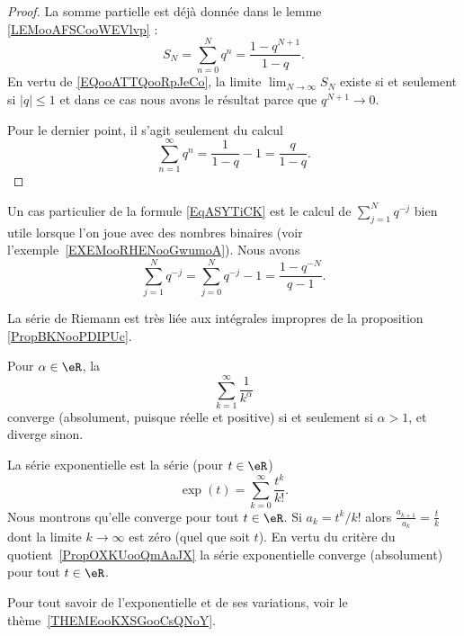 \begin{proof}
    La somme partielle est déjà donnée dans le lemme \ref{LEMooAFSCooWEVlvp} :
    \begin{equation}
        S_N=\sum_{n=0}^Nq^n=\frac{ 1-q^{N+1} }{ 1-q }.
    \end{equation}
    En vertu de \eqref{EQooATTQooRpJeCo}, la limite \( \lim_{N\to \infty} S_N\) existe si et seulement si \( | q |\leq 1\) et dans ce cas nous avons le résultat parce que \( q^{N+1}\to 0\).

    Pour le dernier point, il s'agit seulement du calcul
    \begin{equation}
        \sum_{n=1}^{\infty}q^n=\frac{1}{ 1-q }-1=\frac{ q }{ 1-q }.
    \end{equation}
\end{proof}



Un cas particulier de la formule \eqref{EqASYTiCK} est le calcul de \( \sum_{j=1}^{N}q^{-j}\) bien utile lorsque l'on joue avec des nombres binaires (voir l'exemple~\ref{EXEMooRHENooGwumoA}). Nous avons
\begin{equation}        \label{EQooFMBAooEJkHWT}
    \sum_{j=1}^Nq^{-j}=\sum_{j=0}^Nq^{-j}-1=\frac{ 1-q^{-N} }{ q-1 }.
\end{equation}

La série de Riemann est très liée aux intégrales impropres de la proposition \ref{PropBKNooPDIPUc}.
\begin{proposition} \label{PROPooFPVZooGnsqrs}      \label{EXooCTYNooCjYQvJ}
    Pour $\alpha \in \eR$, la 
    \begin{equation}        \label{EqSerRiem}
        \sum_{k=1}^\infty \frac{ 1 }{ k^{\alpha}}
    \end{equation}
    converge (absolument, puisque réelle et positive) si et seulement si $\alpha > 1$, et diverge sinon.
\end{proposition}

\begin{example} \label{ExIJMHooOEUKfj}
    La série exponentielle est la série (pour \( t\in \eR\))
    \begin{equation}
        \exp(t)=\sum_{k=0}^{\infty}\frac{ t^k }{ k! }.
    \end{equation}
    Nous montrons qu'elle converge pour tout \( t\in \eR\). Si \( a_k=t^k/k!\) alors \( \frac{ a_{k+1} }{ a_k }=\frac{ t }{ k }\) dont la limite \( k\to \infty\) est zéro (quel que soit \( t\)). En vertu du critère du quotient~\ref{PropOXKUooQmAaJX} la série exponentielle converge (absolument) pour tout \( t\in \eR\).

    Pour tout savoir de l'exponentielle et de ses variations, voir le thème~\ref{THEMEooKXSGooCsQNoY}.
\end{example}

